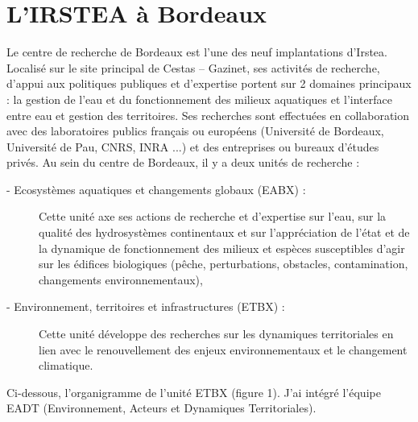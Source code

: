 \documentclass[12pt,a4paper,titlepage,twoside]{report}
\begin{document}
\section{L'IRSTEA à Bordeaux}
Le centre de recherche de Bordeaux est l’une des neuf implantations d'Irstea. Localisé sur le site principal de Cestas – Gazinet, ses activités de recherche, d’appui aux politiques publiques et d’expertise portent sur 2 domaines principaux : la gestion de l’eau et du fonctionnement des milieux aquatiques et l’interface entre eau et gestion des territoires. \newline\newline
Ses recherches sont effectuées en collaboration avec des laboratoires publics français ou européens (Université de Bordeaux, Université de Pau, CNRS, INRA ...) et des entreprises ou bureaux d’études privés. \newline\newline
Au sein du centre de Bordeaux, il y a deux unités de recherche :
\begin{description}
\item[- Ecosystèmes aquatiques et changements globaux (EABX) : ]Cette unité axe ses actions de recherche et d’expertise sur l’eau, sur la qualité des hydrosystèmes continentaux et sur l’appréciation de l’état et de la dynamique de fonctionnement des milieux et espèces susceptibles d’agir sur les édifices biologiques (pêche, perturbations, obstacles, contamination, changements environnementaux),
\item[- Environnement, territoires et infrastructures (ETBX) : ] Cette unité développe des recherches sur les dynamiques territoriales en lien avec le renouvellement des enjeux environnementaux et le changement climatique.\newline
\end{description}
Ci-dessous, l'organigramme de l'unité ETBX (figure 1). J'ai intégré l'équipe EADT (Environnement, Acteurs et Dynamiques Territoriales). \newline
\end{document}
